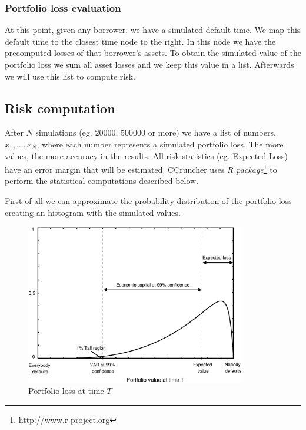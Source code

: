 \documentclass[a4paper,12pt,final]{article}
\begin{document}
\subsubsection{Portfolio loss evaluation}
At this point, given any borrower, we have a simulated default time. We map
this default time to the closest time node to the right. In this node we have 
the precomputed losses of that borrower's assets. To obtain the simulated 
value of the portfolio loss we sum all asset losses and we keep this value 
in a list. Afterwards we will use this list to compute risk.

\subsection{Risk computation}
After $N$ simulations (eg. $20000$, $500000$ or more) we have a list
of numbers, ${x_1, ..., x_N}$, where each number represents a simulated portfolio 
loss. The more values, the more accuracy in the results. All risk statistics (eg. 
Expected Loss) have an error margin that will be estimated. CCruncher uses 
\emph{R package}\footnote{http://www.r-project.org} to perform the statistical
computations described below.
\newline

First of all we can approximate the probability distribution of the portfolio 
loss creating an histogram with the simulated values.

\begin{figure}[!hbt]
\begin{center}
\includegraphics[height=7cm, angle=0]{./images/creditvar.eps}
\caption{Portfolio loss at time $T$}
\label{creditvar}
\end{center}
\end{figure}
\FloatBarrier
\end{document}
